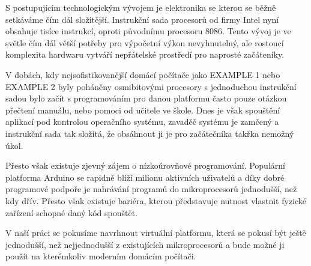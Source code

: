 S postupujícím technologickým vývojem je elektronika se kterou se běžně setkáváme čím dál složitější. Instrukční sada procesorů od firmy Intel nyní obsahuje tisíce instrukcí\cite{x86-instructions}, oproti původnímu procesoru 8086\cite{8086-instructions}. Tento vývoj je ve světle čím dál větší potřeby pro výpočetní výkon nevyhnutelný, ale rostoucí komplexita hardwaru vytváří nepřátelské prostředí pro naprosté začáteníky.

V dobách, kdy nejsofistikovanější domácí počítače jako EXAMPLE 1 nebo EXAMPLE 2 byly poháněny osmibitovými procesory s jednoduchou instrukční sadou bylo začít s programováním pro danou platformu často pouze otázkou přečtení manuálu, nebo pomoci od učitele ve škole. Dnes je však spouštění aplikací pod kontrolou operačního systému, zavaděč systému je zamčený a instrukční sada tak složitá, že obsáhnout ji je pro začátečníka takřka nemožný úkol.

Přesto však existuje zjevný zájem o nízkoúrovňové programování. Populární platforma Arduino se rapidně blíží milionu aktivních uživatelů a díky dobré programové podpoře je nahrávání programů do mikroprocesorů jednodušší, než kdy dřív. Přesto však existuje bariéra, kterou představuje nutnost vlastnit fyzické zařízení schopné daný kód spouštět.

V naší práci se pokusíme navrhnout virtuální platformu, která se pokusí být ještě jednodušší, než nejjednodušší z existujících mikroprocesorů a bude možné ji použít na kterémkoliv moderním domácím počítači.